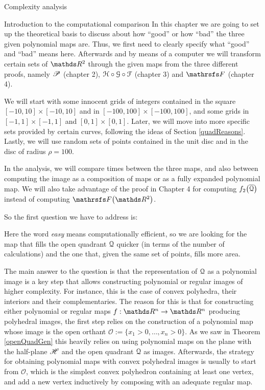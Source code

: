 \documentclass[11pt, a4paper, english, twoside, notitlepage, openright]{report}
\begin{document}
\begin{chapter}{Complexity analysis}\label{compChapter}

\begin{section}{Introduction to the computational comparison}\label{5sect1}
In this chapter we are going to set up the theoretical basis to discuss about how ``good'' or how ``bad'' the three given polynomial maps are. Thus, we first need to clearly specify what ``good'' and ``bad'' means here. Afterwards and by means of a computer we will transform certain sets of $\R^2$ through the given maps from the three different proofs, namely $\P$ (chapter 2), $\HH\circ\GG\circ\FF$ (chapter 3) and $\FFF$ (chapter 4).

We will start with some innocent grids of integers contained in the square $[-10, 10]\times[-10, 10]$ and in $[-100, 100]\times[-100, 100]$, and some grids in $[-1, 1]\times[-1, 1]$ and $[0, 1]\times[0, 1]$. Later, we will move into more specific sets provided by certain curves, following the ideas of  Section \ref{quadReasons}. Lastly, we will use random sets of points contained in the unit disc and in the disc of radius $\rho=100$.

In the analysis, we will compare times between the three maps, and also between computing the image as a composition of maps or as a fully expanded polynomial map. We will also take advantage of the proof in Chapter 4 for computing $f_2\big(\overline{\Qu}\big)$ instead of computing $\FFF\big(\R^2\big)$.

So the first question we have to address is:

\begin{center}
\end{center}

Here the word \textit{easy} means computationally efficient, so we are looking for the map that fills the open quadrant $\Qu$ quicker (in terms of the number of calculations) and the one that, given the same set of points, fills more area.

The main answer to the question is that the representation of $\Qu$ as a polynomial image is a key step that allows constructing polynomial or regular images of higher complexity. For instance, this is the case of convex polyhedra, their interiors and their complementaries. The reason for this is that for constructing either polynomial or regular maps $f:\R^n\to\R^n$ producing polyhedral images, the first step relies on the construction of a polynomial map whose image is the open orthant $\mathscr{O}:=\{x_1>0,\dots,x_n>0\}$. As we saw in Theorem \ref{openQuadGen} this heavily relies on using polynomial maps on the plane with the half-plane $\H$ and the open quadrant $\Qu$ as images. Afterwards, the strategy for obtaining polynomial maps with convex polyhedral images is usually to start from $\mathscr{O}$, which is the simplest convex polyhedron containing at least one vertex, and add a new vertex inductively by composing with an adequate regular map.


\end{section}
\end{chapter}
\end{document}
